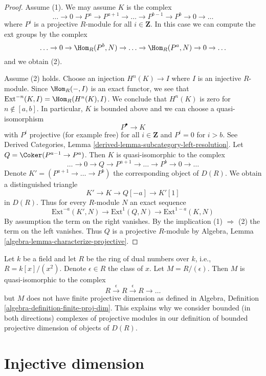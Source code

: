 \begin{proof}
Assume (1). We may assume $K$ is the complex
$$
\ldots \to 0 \to P^a \to P^{a + 1} \to \ldots \to
P^{b - 1} \to P^b \to 0 \to \ldots
$$
where $P^i$ is a projective $R$-module for all $i \in \mathbf{Z}$.
In this case we can compute the ext groups by the complex
$$
\ldots \to 0 \to \Hom_R(P^b, N) \to \ldots \to
\Hom_R(P^a, N) \to 0 \to \ldots
$$
and we obtain (2).

\medskip\noindent
Assume (2) holds. Choose an injection $H^n(K) \to I$ where $I$
is an injective $R$-module. Since $\Hom_R(-, I)$ is an exact functor,
we see that $\text{Ext}^{-n}(K, I) = \Hom_R(H^n(K), I)$.
We conclude that $H^n(K)$ is zero for $n \not \in [a, b]$.
In particular, $K$ is bounded above and we can choose a quasi-isomorphism
$$
P^\bullet \to K
$$
with $P^i$ projective (for example free) for all $i \in \mathbf{Z}$ and
$P^i = 0$ for $i > b$. See Derived Categories, Lemma
\ref{derived-lemma-subcategory-left-resolution}.
Let $Q = \Coker(P^{a - 1} \to P^a)$. Then $K$ is quasi-isomorphic
to the complex
$$
\ldots \to 0 \to Q \to P^{a + 1} \to \ldots \to P^b \to 0 \to \ldots
$$
Denote $K' = (P^{a + 1} \to \ldots \to P^b)$ the corresponding object of
$D(R)$. We obtain a distinguished triangle
$$
K' \to K \to Q[-a] \to K'[1]
$$
in $D(R)$. Thus for every $R$-module $N$ an exact sequence
$$
\text{Ext}^{-a}(K', N) \to \text{Ext}^1(Q, N) \to \text{Ext}^{1 - a}(K, N)
$$
By assumption the term on the right vanishes. By the implication
(1) $\Rightarrow$ (2) the term on the left vanishes. Thus $Q$
is a projective $R$-module by
Algebra, Lemma \ref{algebra-lemma-characterize-projective}.
\end{proof}

\begin{example}
\label{example-ext-not-bounded}
Let $k$ be a field and let $R$ be the ring of dual numbers
over $k$, i.e., $R = k[x]/(x^2)$. Denote $\epsilon \in R$ the
class of $x$. Let $M = R/(\epsilon)$. Then $M$ is quasi-isomorphic
to the complex
$$
R \xrightarrow{\epsilon} R \xrightarrow{\epsilon} R \to \ldots
$$
but $M$ does not have finite projective dimension as defined in
Algebra, Definition \ref{algebra-definition-finite-proj-dim}.
This explains why we consider bounded (in both directions) complexes
of projective modules in our definition of bounded projective dimension
of objects of $D(R)$.
\end{example}






\section{Injective dimension}
\label{section-injective-dimension}

